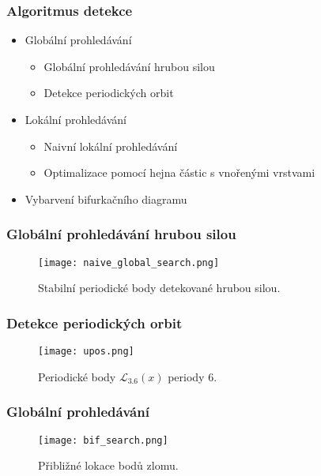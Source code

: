 \documentclass[lualatex,hyperref={pdfencoding=auto}]{beamer}
\begin{document}
\begin{frame}
    \frametitle{Algoritmus detekce}
    
\begin{itemize}
    \item Globální prohledávání
        \begin{itemize}
            \item Globální prohledávání hrubou silou
            \item Detekce periodických orbit
        \end{itemize}
    \item Lokální prohledávání
        \begin{itemize}
            \item Naivní lokální prohledávání
            \item Optimalizace pomocí hejna částic s vnořenými vrstvami
        \end{itemize}
    \item Vybarvení bifurkačního diagramu
\end{itemize}

\end{frame}


\begin{frame}
    \frametitle{Globální prohledávání hrubou silou}
    
    \begin{figure}[!h]
        \centering
        \texttt{[image: naive\_global\_search.png]}
        \caption{Stabilní periodické body detekované hrubou silou.}
    \end{figure}
    
\end{frame}


\begin{frame}
    \frametitle{Detekce periodických orbit}
    
    \begin{figure}[!h]
        \centering
        \texttt{[image: upos.png]}
        \caption{Periodické body $\mathcal{L}_{3.6}(x)$ periody $6$.}
    \end{figure}
\end{frame}


\begin{frame}
    \frametitle{Globální prohledávání}
    
    \begin{figure}[!h]
        \centering
        \texttt{[image: bif\_search.png]}
        \caption{Přibližné lokace bodů zlomu.}
    \end{figure}
    
\end{frame}
\end{document}
